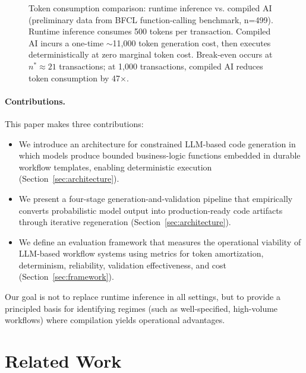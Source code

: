 \documentclass[11pt]{article}
\begin{document}
\begin{figure}[ht]
\begin{tikzpicture}[scale=0.9]
\end{tikzpicture}
\caption{Token consumption comparison: runtime inference vs. compiled AI (preliminary data from BFCL function-calling benchmark, n=499). Runtime inference consumes 500 tokens per transaction. Compiled AI incurs a one-time $\sim$11,000 token generation cost, then executes deterministically at zero marginal token cost. Break-even occurs at $n^*\approx21$ transactions; at 1,000 transactions, compiled AI reduces token consumption by 47$\times$.}
\label{fig:economics}
\end{figure}

\paragraph{Contributions.}
This paper makes three contributions:
\begin{itemize}
    \item We introduce an architecture for constrained LLM-based code generation in which models produce bounded business-logic functions embedded in durable workflow templates, enabling deterministic execution (Section~\ref{sec:architecture}).
    \item We present a four-stage generation-and-validation pipeline that empirically converts probabilistic model output into production-ready code artifacts through iterative regeneration (Section~\ref{sec:architecture}).
    \item We define an evaluation framework that measures the operational viability of LLM-based workflow systems using metrics for token amortization, determinism, reliability, validation effectiveness, and cost (Section~\ref{sec:framework}).
\end{itemize}

Our goal is not to replace runtime inference in all settings, but to provide a principled basis for identifying regimes (such as well-specified, high-volume workflows) where compilation yields operational advantages.

\section{Related Work}
\label{sec:related-work}
\end{document}
